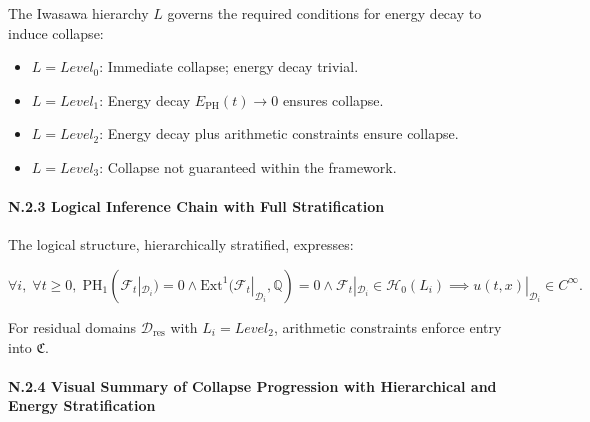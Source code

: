 \documentclass[11pt]{article}
\begin{document}
The Iwasawa hierarchy $L$ governs the required conditions for energy decay to induce collapse:

\begin{itemize}
  \item $L = Level_0$: Immediate collapse; energy decay trivial.
  \item $L = Level_1$: Energy decay $E_{\mathrm{PH}}(t) \to 0$ ensures collapse.
  \item $L = Level_2$: Energy decay plus arithmetic constraints ensure collapse.
  \item $L = Level_3$: Collapse not guaranteed within the framework.
\end{itemize}

\paragraph{N.2.3 Logical Inference Chain with Full Stratification}

The logical structure, hierarchically stratified, expresses:

\[
\forall i,\; \forall t \geq 0,\;
\mathrm{PH}_1(\mathcal{F}_t|_{\mathcal{D}_i}) = 0 \land \mathrm{Ext}^1(\mathcal{F}_t|_{\mathcal{D}_i}, \mathbb{Q}) = 0 \land \mathcal{F}_t|_{\mathcal{D}_i} \in \mathcal{H}_0(L_i) \implies u(t, x)|_{\mathcal{D}_i} \in C^\infty.
\]

For residual domains $\mathcal{D}_{\mathrm{res}}$ with $L_i = Level_2$, arithmetic constraints enforce entry into $\mathfrak{C}$.

\paragraph{N.2.4 Visual Summary of Collapse Progression with Hierarchical and Energy Stratification}

\begin{center}
\end{center}
\end{document}
